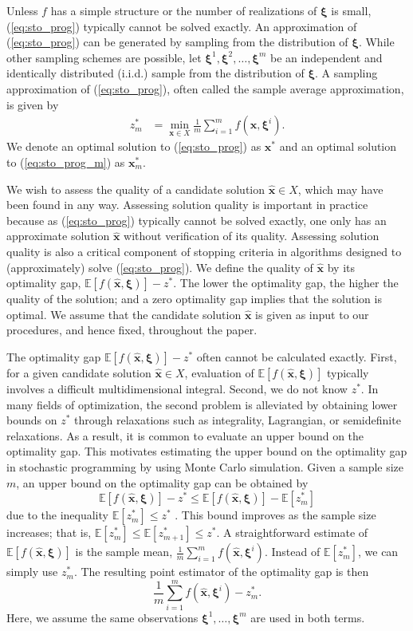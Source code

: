 \documentclass[12pt]{article}
\newcommand{\e}[1]{\mathbb{E} \left[ #1 \right]
}
\newcommand{\x}{\mathbf{x}}
\newcommand{\xh}{{\hat{\x}}}
\newcommand{\xs}{\x^*}
\newcommand{\xit}{\boldsymbol{\xi}}
\newcommand{\xiti}{\xit^i}
\newcommand{\zs}{z^*}
\begin{document}
Unless $f$ has a simple structure or the number of realizations of $\xit$ is small, (\ref{eq:sto_prog}) typically cannot be solved exactly. 
An approximation of (\ref{eq:sto_prog}) can be generated by sampling from the distribution of $\xit$.
While other sampling schemes are possible, let $\xit^1, \xit^2, \dots, \xit^m$ be an independent and identically distributed (i.i.d.) sample from the distribution of $\xit$.
A sampling approximation of (\ref{eq:sto_prog}), often called the sample average approximation, is given by\vspace*{-0.07in}
\begin{align} \tag{SP$_m$} \label{eq:sto_prog_m}
	z_m^* & = \min_{\x \in X} \frac{1}{m} \sum_{i=1}^m f(\x,\xiti).
\end{align}
We denote an optimal solution to (\ref{eq:sto_prog}) as $\xs$ and an optimal solution to (\ref{eq:sto_prog_m}) as $\xs_m$.



We wish to assess the quality of a candidate solution $\xh \in X$, which may have been found in any way.
Assessing solution quality is important in practice because as (\ref{eq:sto_prog}) typically cannot be solved exactly, one only has an approximate solution $\xh$ without verification of its quality.
Assessing solution quality is also a critical component of stopping criteria in algorithms designed to (approximately) solve (\ref{eq:sto_prog}).
We define the quality of $\xh$ by its optimality gap, $\e{f(\xh,\xit)} - \zs$. 
The lower the optimality gap, the higher the quality of the solution; and a zero optimality gap implies that the solution is optimal. 
We assume that the candidate solution $\xh$ is given as input to our procedures, and hence fixed, throughout the paper. 


The optimality gap $\e{f(\xh,\xit)} - \zs$ often cannot be calculated exactly. First, for a given candidate solution $\xh \in X$, evaluation of $\e{f(\xh,\xit)}$ typically involves a difficult multidimensional integral. 
Second, we do not know $\zs$. 
In many fields of optimization, the second problem is alleviated by obtaining lower bounds on $\zs$ through relaxations such as integrality, Lagrangian, or semidefinite relaxations.
As a result, it is common to evaluate an upper bound on the optimality gap. 
This motivates estimating the upper bound on the optimality gap in stochastic programming by using Monte Carlo simulation.
Given a sample size $m$, an upper bound on the optimality gap can be obtained by $$
\e{f(\xh,\xit)} - \zs \leq \e{f(\xh,\xit)} - \e{\zs_m}
$$ 
due to the inequality $\e{\zs_m} \leq \zs$ \citep{Mak1999,norkin_pflug_ruszczynski_98}.
This bound improves as the sample size increases; that is, $\e{\zs_m} \leq \e{\zs_{m+1}} \leq \zs$.  
A straightforward estimate of $\e{f(\xh,\xit)}$ is the sample mean, $\frac{1}{m} \sum_{i=1}^m f(\xh,\xiti)$. 
Instead of $\e{\zs_m}$, we can simply use $\zs_m$.  
The resulting point estimator of the optimality gap is then 
$$
\frac{1}{m} \sum_{i=1}^m f(\xh,\xiti) - \zs_m.
$$ 
Here, we assume the same observations $\xit^1, \dots, \xit^m$ are used in both terms.  
\end{document}
